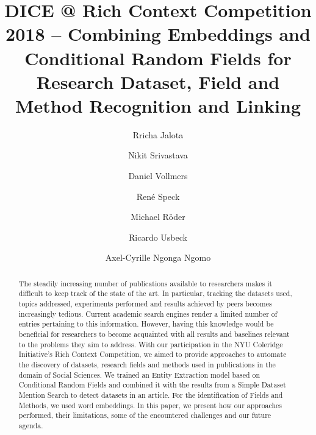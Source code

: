 \documentclass[runningheads]{llncs}
\title{DICE @ Rich Context Competition 2018 -- Combining Embeddings and Conditional Random Fields for Research Dataset, Field and Method Recognition and Linking}
\author{Rricha Jalota \and Nikit Srivastava \and Daniel Vollmers \and René Speck \and Michael R\"oder \and Ricardo Usbeck\orcidID{0000-0002-0191-7211} \and Axel-Cyrille {Ngonga Ngomo}}
\institute{
Data Science Group, Paderborn University, Germany\\
\email{firstname.lastname@uni-paderborn.de}
}
\begin{document}
\maketitle

\begin{abstract}
    The steadily increasing number of publications available to researchers makes it difficult to keep track of the state of the art. In particular, tracking the datasets used, topics addressed, experiments performed and results achieved by peers becomes increasingly tedious. Current academic search engines %
    render a limited number of entries pertaining to this information. However, having this knowledge would be beneficial for researchers to become acquainted with all results and baselines relevant to the problems they aim to address. With our participation in the NYU Coleridge Initiative’s Rich Context Competition, we aimed to provide approaches to automate the discovery of datasets, research fields and methods used in publications in the domain of Social Sciences. We trained an Entity Extraction model based on Conditional Random Fields and combined it with the results from a Simple Dataset Mention Search to detect datasets in an article.  For the identification of Fields and Methods, we used word embeddings. In this paper, we present how our approaches performed, their limitations, some of the encountered challenges and our future agenda.
\end{abstract}

\end{document}
